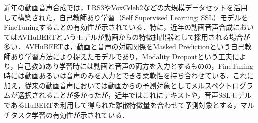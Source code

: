 \documentclass[12pt]{jarticle}
\numberwithin{equation}{section}    %
\numberwithin{figure}{section}      %
\numberwithin{table}{section}      %
\begin{document}

近年の動画音声合成では，LRS3\cite{afouras2018lrs3}やVoxCeleb2\cite{chung2018voxceleb2}などの大規模データセットを活用して構築された，自己教師あり学習（Self Supervised Learning; SSL）モデルをFineTuningすることの有効性が示されている．特に，近年の動画音声合成においてはAVHuBERT\cite{shi2022learning}というモデルが動画からの特徴抽出器として採用される場合が多い．AVHuBERTは，動画と音声の対応関係をMasked Predictionという自己教師あり学習方法により捉えたモデルであり，Modality Dropoutという工夫により，自己教師あり学習時には動画と音声の両方を入力とするものの，FineTuning時には動画あるいは音声のみを入力とできる柔軟性を持ち合わせている．これに加え，従来の動画音声においては動画からの予測対象としてメルスペクトログラムが選択されることが多かったが，近年ではこれにテキストや，音声SSLモデルであるHuBERTを利用して得られた離散特徴量を合わせて予測対象とする，マルチタスク学習の有効性が示されている\cite{kim2023lip_multitask,choi2023intelligible}．
\end{document}
